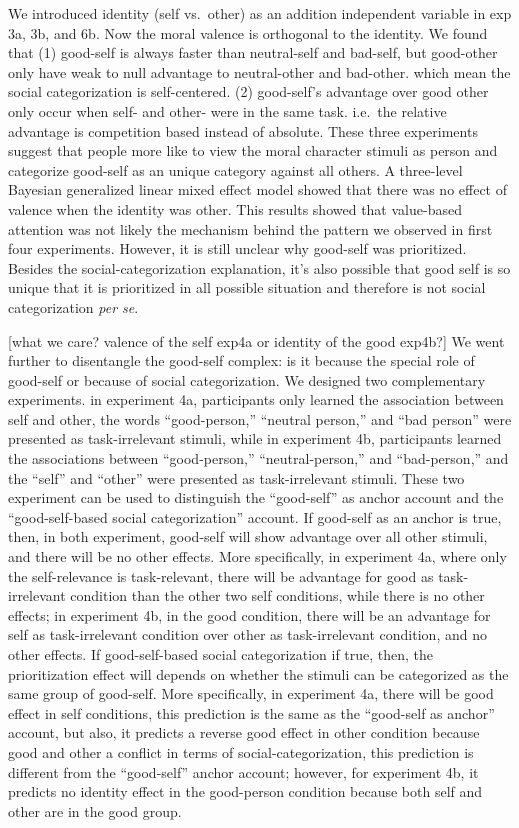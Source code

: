 \documentclass[
  english,
  man]{apa6}
\begin{document}
We introduced identity (self vs.~other) as an addition independent variable in exp 3a, 3b, and 6b. Now the moral valence is orthogonal to the identity. We found that (1) good-self is always faster than neutral-self and bad-self, but good-other only have weak to null advantage to neutral-other and bad-other. which mean the social categorization is self-centered. (2) good-self's advantage over good other only occur when self- and other- were in the same task. i.e.~the relative advantage is competition based instead of absolute. These three experiments suggest that people more like to view the moral character stimuli as person and categorize good-self as an unique category against all others. A three-level Bayesian generalized linear mixed effect model showed that there was no effect of valence when the identity was other. This results showed that value-based attention was not likely the mechanism behind the pattern we observed in first four experiments. However, it is still unclear why good-self was prioritized. Besides the social-categorization explanation, it's also possible that good self is so unique that it is prioritized in all possible situation and therefore is not social categorization \emph{per se}.

{[}what we care? valence of the self exp4a or identity of the good exp4b?{]}
We went further to disentangle the good-self complex: is it because the special role of good-self or because of social categorization. We designed two complementary experiments. in experiment 4a, participants only learned the association between self and other, the words ``good-person,'' ``neutral person,'' and ``bad person'' were presented as task-irrelevant stimuli, while in experiment 4b, participants learned the associations between ``good-person,'' ``neutral-person,'' and ``bad-person,'' and the ``self'' and ``other'' were presented as task-irrelevant stimuli. These two experiment can be used to distinguish the ``good-self'' as anchor account and the ``good-self-based social categorization'' account. If good-self as an anchor is true, then, in both experiment, good-self will show advantage over all other stimuli, and there will be no other effects. More specifically, in experiment 4a, where only the self-relevance is task-relevant, there will be advantage for good as task-irrelevant condition than the other two self conditions, while there is no other effects; in experiment 4b, in the good condition, there will be an advantage for self as task-irrelevant condition over other as task-irrelevant condition, and no other effects. If good-self-based social categorization if true, then, the prioritization effect will depends on whether the stimuli can be categorized as the same group of good-self. More specifically, in experiment 4a, there will be good effect in self conditions, this prediction is the same as the ``good-self as anchor'' account, but also, it predicts a reverse good effect in other condition because good and other a conflict in terms of social-categorization, this prediction is different from the ``good-self'' anchor account; however, for experiment 4b, it predicts no identity effect in the good-person condition because both self and other are in the good group.
\end{document}

